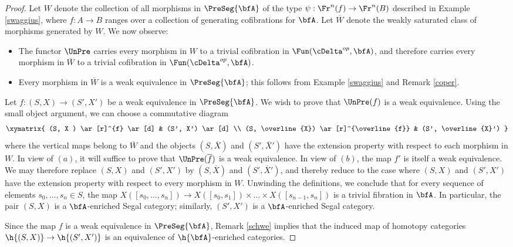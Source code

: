 \begin{proof}
Let $W$ denote the collection of all morphisms in $\PreSeg{\bfA}$ of the type
$\psi: \Fr^{n}(f) \rightarrow \Fr^{n}(B)$ described in Example \ref{swaggius}, where
$f: A \rightarrow B$ ranges over a collection of generating cofibrations for $\bfA$.
Let $\overline{W}$ denote the weakly saturated class of morphisms generated by
$W$. We now observe:
\begin{itemize}
\item[$(a)$] The functor $\UnPre$ carries every morphism in $W$ to a trivial cofibration in
$\Fun( \cDelta^{op}, \bfA)$, and therefore carries every morphism in $\overline{W}$ to a trivial cofibration in $\Fun( \cDelta^{op}, \bfA)$.

\item[$(b)$] Every morphism in $\overline{W}$ is a weak equivalence in $\PreSeg{\bfA}$;
this follows from Example \ref{swaggius} and Remark \ref{coper}.
\end{itemize}

Let $f: (S,X) \rightarrow (S', X')$ be a weak equivalence in $\PreSeg{\bfA}$. 
We wish to prove that $\UnPre(f)$ is a weak equivalence. Using the small
object argument, we can choose a commutative diagram
$$ \xymatrix{ (S, X ) \ar[r]^{f} \ar[d] & (S', X') \ar[d] \\
(S, \overline{X}) \ar[r]^{\overline{f}} & (S', \overline{X}') }$$
where the vertical maps belong to $\overline{W}$ and the objects
$(S, \overline{X})$ and $(S', \overline{X}')$ have the extension property with respect
to each morphism in $W$. In view of $(a)$, it will suffice to prove that
$\UnPre( \overline{f} )$ is a weak equivalence. In view of $(b)$, the map
$f'$ is itself a weak equivalence. We may therefore replace
$(S,X)$ and $(S', X')$ by $(S, \overline{X})$ and $(S', \overline{X}')$, and thereby reduce to the case where $(S,X)$ and $(S', X')$ have the extension property with respect to every morphism in $W$.
Unwinding the definitions, we conclude that for every sequence of elements $s_0, \ldots, s_n \in S$,
the map $X( [s_0, \ldots, s_n]) \rightarrow X( [s_0, s_1]) \times \ldots \times X( [s_{n-1}, s_n])$ is
a trivial fibration in $\bfA$. In particular, the pair $(S,X)$ is a $\bfA$-enriched Segal category;
similarly, $(S', X')$ is a $\bfA$-enriched Segal category. 

Since the map $f$ is a weak equivalence in $\PreSeg{\bfA}$, Remark \ref{schwe} implies
that the induced map of homotopy categories $\h{(S,X)} \rightarrow \h{(S',X')}$ is an equivalence of
$\h{\bfA}$-enriched categories.


\end{proof}

